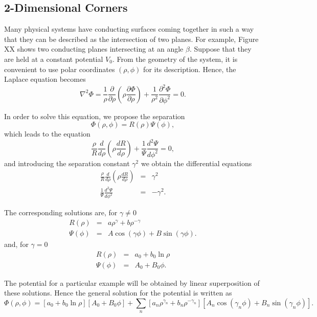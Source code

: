 \subsection{2-Dimensional Corners}
Many physical systems have conducting surfaces coming together in such a way that they can be described as the intersection of two planes. For example,  Figure XX  shows two conducting planes intersecting at an angle $\beta$. Suppose that they are held at a constant potential $V_0$. From the geometry of the system, it is convenient to use polar coordinates $(\rho, \phi)$ for its description. Hence, the Laplace equation becomes
\begin{equation}
\nabla^2 \Phi = \frac{1}{\rho} \frac{\partial}{\partial \rho} \left( \rho \frac{\partial \Phi}{\partial \rho} \right) + \frac{1}{\rho^2} \frac{\partial ^2 \Phi}{\partial \phi^2} =0.
\end{equation}

In order to solve this equation, we propose the separation
\begin{equation}
\Phi (\rho, \phi) = R(\rho) \Psi (\phi),
\end{equation}
which leads to the equation
\begin{equation}
\frac{\rho}{R} \frac{d}{d \rho} \left( \rho \frac{d R}{d \rho} \right) + \frac{1}{\Psi} \frac{d ^2 \Psi}{d \phi^2} =0,
\end{equation}
and introducing the separation constant $\gamma^2$ we obtain the differential equations
\begin{eqnarray}
\frac{\rho}{R} \frac{d}{d \rho} \left( \rho \frac{d R}{d \rho} \right) &=& \gamma^2 \\
 \frac{1}{\Psi} \frac{d ^2 \Psi}{d \phi^2} &=& - \gamma^2.
\end{eqnarray}

The corresponding  solutions are, for $\gamma \neq 0$
\begin{eqnarray}
R(\rho) &=&  a \rho^\gamma + b \rho^{-\gamma} \\
\Psi (\phi) &=& A \cos (\gamma \phi ) + B \sin (\gamma \phi ).
\end{eqnarray}
and, for $\gamma =0$
\begin{eqnarray}
R(\rho) &=&  a_0  + b_0 \ln \rho \\
\Psi (\phi) &=& A_0  + B_0  \phi .
\end{eqnarray}

The potential for a particular example will be obtained by linear superposition of these solutions. Hence the general solution for the potential is written as
\begin{equation}
\Phi (\rho, \phi) = \left[ a_0  + b_0 \ln \rho \right]\left[ A_0  + B_0  \phi  \right] + \sum_n \left[ a_n \rho^{\gamma_n} + b_n \rho^{-\gamma_n} \right] \left[ A_n \cos (\gamma_n \phi ) + B_n \sin (\gamma_n \phi ) \right]. \label{eq:CylindricalPotential}
\end{equation}

